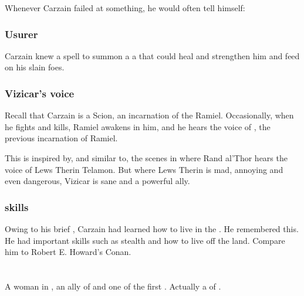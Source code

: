 Whenever Carzain failed at something, he would often tell himself: 





\subsubsection{Usurer}
Carzain knew a spell to summon a \dash a \daemon that could heal and strengthen him and feed on his slain foes. 





\subsubsection{Vizicar's voice}
Recall that Carzain is a Scion, an incarnation of the \Malach{} Ramiel. 
Occasionally, when he fights and kills, Ramiel awakens in him, and he hears the voice of \VizicarDurasRespina, the previous incarnation of Ramiel. 

This is inspired by, and similar to, the scenes in  where Rand al'Thor hears the voice of Lews Therin Telamon. But where Lews Therin is mad, annoying and even dangerous, Vizicar is sane and a powerful ally. 





\subsubsection{\Wylde skills}
Owing to his brief , Carzain had learned how to live in the \wylde. 
He remembered this. 
He had important skills such as stealth and how to live off the land. 
Compare him to Robert E. Howard's Conan.















\section{\Delphine}
\index{\Delphine}
A \human{} woman in , an ally of  and one of the first . 
Actually a  of . 









